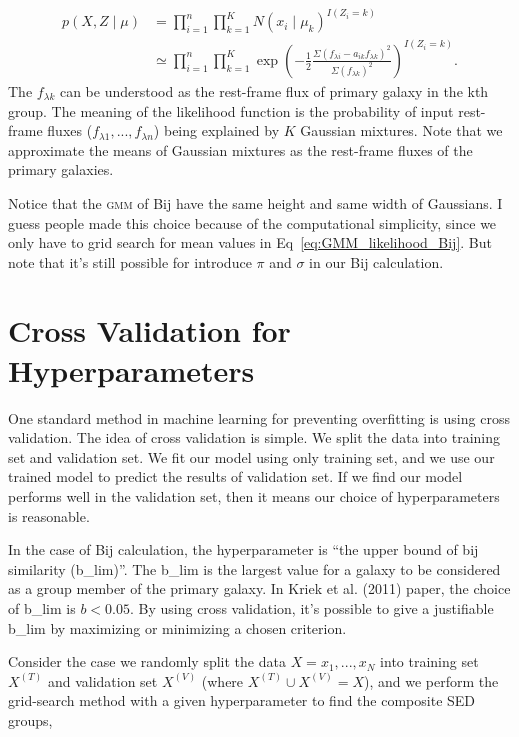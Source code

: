 \documentclass[12pt,letterpaper]{article}
\begin{document}
\begin{equation}
    \begin{split}
        p(X, Z \mid \mu) 
        &= 
        \prod_{i=1}^{n} \prod_{k=1}^{K} 
        N(x_i \mid \mu_k)^{I(Z_i = k)}\\
        &\simeq 
        \prod_{i=1}^{n} \prod_{k=1}^{K} 
        \exp{\left( - \frac{1}{2}  \frac{ \Sigma (f_{\lambda i} - a_{ik} f_{\lambda k} )^2 }{ \Sigma (f_{\lambda k})^2 }  \right)}^{I(Z_i = k)}.
    \end{split}
    \label{eq:GMM_likelihood_Bij}
\end{equation}
The $f_{\lambda k}$ can be understood as the rest-frame flux
of primary galaxy in the kth group.
The meaning of the likelihood function is the
probability of input rest-frame fluxes 
($f_{\lambda 1}, ..., f_{\lambda n}$)
being explained by $K$ Gaussian mixtures.
Note that we approximate the means of Gaussian mixtures as the rest-frame fluxes of the primary galaxies.

Notice that the \textsc{gmm} of Bij have the same height and same width of Gaussians.
I guess people made this choice because of the computational simplicity, 
since we only have to grid search for mean values in Eq~\ref{eq:GMM_likelihood_Bij}.
But note that it's still possible for introduce $\pi$ and $\sigma$ in our Bij calculation.

\section*{Cross Validation for Hyperparameters}

One standard method in machine learning for preventing overfitting is using cross validation.
The idea of cross validation is simple.
We split the data into training set and validation set.
We fit our model using only training set, and we use our trained model to predict the results of validation set.
If we find our model performs well in the validation set, then it means our choice of hyperparameters is reasonable. 

In the case of Bij calculation, the hyperparameter is ``the upper bound of bij similarity (b\_lim)''.
The b\_lim is the largest value for a galaxy to be considered as a group member of the primary galaxy.
In Kriek et al. (2011) paper, the choice of b\_lim is $b < 0.05$.
By using cross validation, it's possible to give a justifiable b\_lim by maximizing or minimizing a chosen criterion.

Consider the case we randomly split the data $X = x_1, ..., x_N$ into training set $X^{(T)}$ and validation set $X^{(V)}$ (where $X^{(T)} \cup X^{(V)} = X$), and we perform the grid-search method with a given hyperparameter to find the composite SED groups,
\end{document}
